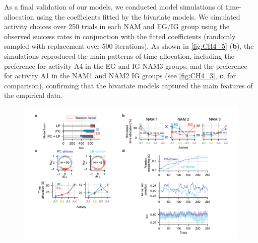 As a final validation of our models, we conducted model simulations of time-allocation using the coefficients fitted by the bivariate models. We simulated activity choices over 250 trials in each \ac{NAM} and \ac{EG}/\ac{IG} group using the observed success rates in conjunction with the fitted coefficients (randomly sampled with replacement over 500 iterations). As shown in \cref{fig:CH4_5} (\textbf{b}), the simulations reproduced the main patterns of  time allocation, including the preference for activity A4 in the \ac{EG} and \ac{IG} \ac{NAM}3 groups, and the preference for activity A1 in the \ac{NAM}1 and \ac{NAM}2 \ac{IG} groups (see \cref{fig:CH4_3}, \textbf{c}, for comparison), confirming that the bivariate models captured the main features of the empirical data.

\begin{figure}[tbh!]
    \centering
    \includegraphics[width=\textwidth]{Figures/c4/figure5.pdf}

\end{figure}

